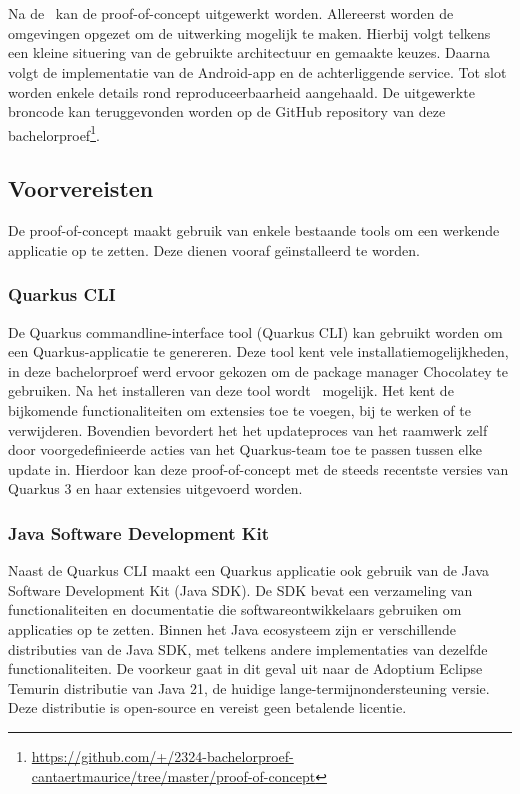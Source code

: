 
\chapter{}
\label{ch:proof-of-concept}
Na de~ kan de proof-of-concept uitgewerkt worden.
Allereerst worden de omgevingen opgezet om de uitwerking mogelijk te maken.
Hierbij volgt telkens een kleine situering van de gebruikte architectuur en gemaakte keuzes.
Daarna volgt de implementatie van de Android-app en de achterliggende service.
Tot slot worden enkele details rond reproduceerbaarheid aangehaald.
De uitgewerkte broncode kan teruggevonden worden op de GitHub repository van deze bachelorproef\footnote{\url{https://github.com/+/2324-bachelorproef-cantaertmaurice/tree/master/proof-of-concept}}.

\section{Voorvereisten}
\label{sec:voorvereisten}
De proof-of-concept maakt gebruik van enkele bestaande tools om een werkende applicatie op te zetten.
Deze dienen vooraf ge\"{\i}nstalleerd te worden.

\subsection{Quarkus CLI}
\label{subsec:de-quarkus-cli}
De Quarkus commandline-interface tool (Quarkus CLI) kan gebruikt worden om een Quarkus-applicatie te genereren.
Deze tool kent vele installatiemogelijkheden, in deze bachelorproef werd ervoor gekozen om de package manager Chocolatey te gebruiken.
Na het installeren van deze tool wordt~ mogelijk.
Het kent de bijkomende functionaliteiten om extensies toe te voegen, bij te werken of te verwijderen.
Bovendien bevordert het het updateproces van het raamwerk zelf door voorgedefinieerde acties van het Quarkus-team toe te passen tussen elke update in.
Hierdoor kan deze proof-of-concept met de steeds recentste versies van Quarkus 3 en haar extensies uitgevoerd worden.

\subsection{Java Software Development Kit}
\label{subsec:java-software-development-kit}
Naast de Quarkus CLI maakt een Quarkus applicatie ook gebruik van de Java Software Development Kit (Java SDK).
De SDK bevat een verzameling van functionaliteiten en documentatie die softwareontwikkelaars gebruiken om applicaties op te zetten.
Binnen het Java ecosysteem zijn er verschillende distributies van de Java SDK, met telkens andere implementaties van dezelfde functionaliteiten.
De voorkeur gaat in dit geval uit naar de Adoptium Eclipse Temurin distributie van Java 21, de huidige lange-termijnondersteuning versie.
Deze distributie is open-source en vereist geen betalende licentie.

